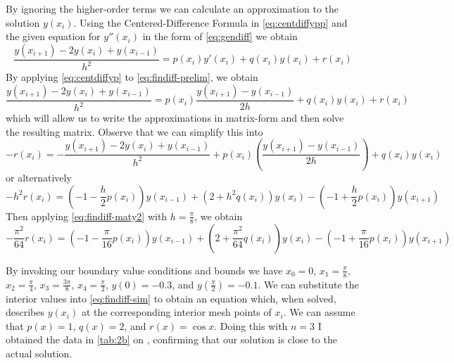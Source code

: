 \documentclass[12pt]{article}
\begin{document}
By ignoring the higher-order terms we can calculate an approximation
to the solution $y(x_i)$. Using the Centered-Difference Formula in
\cref{eq:centdiffypp} and the given equation for $y''(x_i)$ in the
form of \cref{eq:gendiff} we obtain
\begin{equation}
  \label{eq:findiff-prelim}
  \frac{y(x_{i+1})-2y(x_i)+y(x_{i-1})}{h^2} = p(x_i)y'(x_i)+q(x_i)y(x_i)+r(x_i)
\end{equation}
By applying \cref{eq:centdiffyp} to \cref{eq:findiff-prelim}, we obtain
\begin{equation}
  \label{eq:findiff}
  \frac{y(x_{i+1})-2y(x_i)+y(x_{i-1})}{h^2}=p(x_i)\frac{y(x_{i+1}) -
    y(x_{i-1})}{2h}+q(x_i)y(x_i) + r(x_i)
\end{equation}
which will allow us to write the approximations in matrix-form and
then solve the resulting matrix. Observe that we can simplify this
into
\begin{equation*}
  \label{eq:findiff-maty}
  -r(x_i) = -\frac{y(x_{i+1})-2y(x_i)+y(x_{i-1})}{h^2} +
  p(x_i)\left(\frac{y(x_{i+1})-y(x_{i-1})}{2h}\right)+q(x_i)y(x_i)
\end{equation*}
or alternatively
\begin{equation}
  \label{eq:findiff-maty2}
  -h^2r(x_i) = \left(-1-\frac{h}{2}p(x_i)\right)y(x_{i-1}) +
  \left(2+h^2q(x_i)\right)y(x_i) - \left(-1+\frac{h}{2}p(x_i)\right)y(x_{i+1})
\end{equation}
Then applying \cref{eq:findiff-maty2} with $h=\frac{\pi}{8}$, we obtain
\begin{equation}
  \label{eq:findiff-sim}
  -\frac{\pi^2}{64}r(x_i) = \left(-1-\frac{\pi}{16}p(x_i)\right)y(x_{i-1}) +
  \left(2+\frac{\pi^2}{64}q(x_i)\right)y(x_i) - \left(-1+\frac{\pi}{16}p(x_i)\right)y(x_{i+1})
\end{equation}

By invoking our boundary value conditions and bounds we have $x_0=0$,
$x_1=\frac{\pi}{8}$, $x_2=\frac{\pi}{4}$, $x_3=\frac{3\pi}{8}$,
$x_4=\frac{\pi}{2}$, $y(0)=-0.3$, and $y\left(\frac{\pi}{2}\right) =
-0.1$. We can substitute the interior values into
\cref{eq:findiff-sim} to obtain an equation which, when solved,
describes $y(x_i)$ at the corresponding interior mesh points of
$x_i$. We can assume that $p(x)=1$, $q(x)=2$, and $r(x)=\cos x$.
Doing this with $n=3$ I obtained the data in \cref{tab:2b} on
, confirming that our solution is close to the actual
solution.
\end{document}
